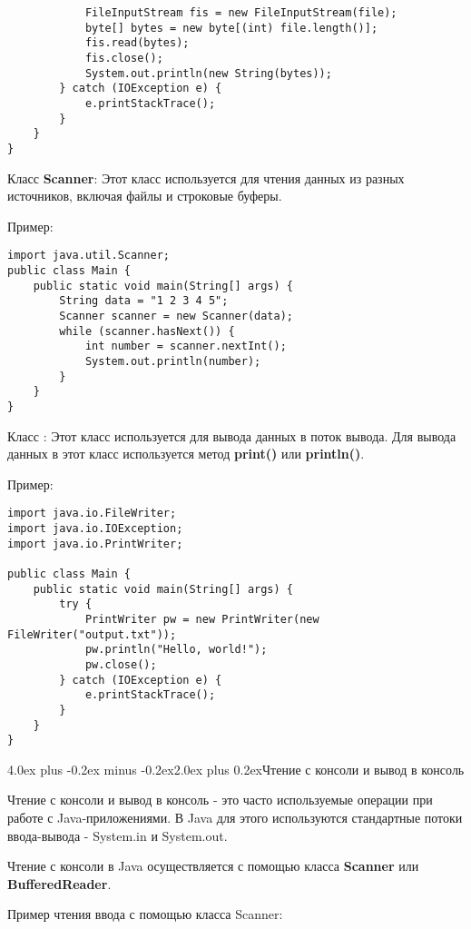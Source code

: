 \documentclass[12pt, a4paper]{book}%
\makeatletter
\renewcommand{\section}{\@startsection{section}{1}{1pt}%
{4.0ex plus -0.2ex minus -0.2ex}{2.0ex plus 0.2ex}{\centering\bf}}%
\makeatother
\begin{document}
{\begin{lstlisting}
            FileInputStream fis = new FileInputStream(file);
            byte[] bytes = new byte[(int) file.length()];
            fis.read(bytes);
            fis.close();
            System.out.println(new String(bytes));
        } catch (IOException e) {
            e.printStackTrace();
        }
    }
}
\end{lstlisting}

Класс {\bf Scanner}: Этот класс используется для чтения данных из разных источников, включая файлы и строковые буферы. 

Пример:

\begin{lstlisting}
import java.util.Scanner;
public class Main {
    public static void main(String[] args) {
        String data = "1 2 3 4 5";
        Scanner scanner = new Scanner(data);
        while (scanner.hasNext()) {
            int number = scanner.nextInt();
            System.out.println(number);
        }
    }
}
\end{lstlisting}

Класс {\bfPrintWriter}: Этот класс используется для вывода данных в поток вывода. Для вывода данных в этот класс используется метод {\bf print()} или {\bf println()}. 

Пример:

\begin{lstlisting}
import java.io.FileWriter;
import java.io.IOException;
import java.io.PrintWriter;

public class Main {
    public static void main(String[] args) {
        try {
            PrintWriter pw = new PrintWriter(new FileWriter("output.txt"));
            pw.println("Hello, world!");
            pw.close();
        } catch (IOException e) {
            e.printStackTrace();
        }
    }
}
\end{lstlisting}

\section{Чтение с консоли и вывод в консоль}

Чтение с консоли и вывод в консоль - это часто используемые операции при работе с Java-приложениями. В Java для этого используются стандартные потоки ввода-вывода - System.in и System.out.

Чтение с консоли в Java осуществляется с помощью класса {\bf Scanner} или {\bf BufferedReader}. 

Пример чтения ввода с помощью класса Scanner:

}
\end{document}
